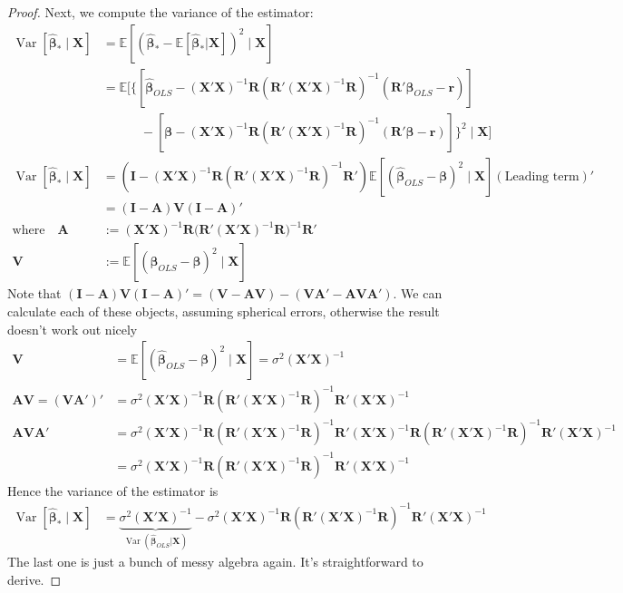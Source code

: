 \documentclass[12pt]{article}
\theoremstyle{plain}
\theoremstyle{definition}
\theoremstyle{remark}
\newcommand{\bsA}{\boldsymbol{A}}
\newcommand{\bsI}{\boldsymbol{I}}
\newcommand{\bsX}{\boldsymbol{X}}
\newcommand{\bsV}{\boldsymbol{V}}
\newcommand{\bsbeta}{\boldsymbol{\beta}}
\newcommand{\bshatbeta}{\boldsymbol{\hat{\beta}}}
\newcommand{\bsR}{\boldsymbol{R}}
\newcommand{\bsr}{\boldsymbol{r}}
\newcommand{\E}{\mathbb{E}}
\newcommand{\Var}{\operatorname{Var}}
\begin{document}
\begin{proof}
Next, we compute the variance of the estimator:
\begin{align*}
  \Var[\bshatbeta_*\;|\;\bsX]
  &=
  \E\left[
    \left(\bshatbeta_*- \E[\bshatbeta_*|\bsX]\right)^2
  \;|\;\bsX \right] \\
  &=
  \E\bigg[
  \bigg\{
  \left[
  \bshatbeta_{OLS} - (\bsX'\bsX)^{-1}  \bsR
  \left(\bsR'(\bsX'\bsX)^{-1}  \bsR\right)^{-1}
  \left(\bsR'\bshatbeta_{OLS} -  \bsr\right)
  \right]\\
  &\qquad\quad
  -
  \left[
  \bsbeta -
  (\bsX'\bsX)^{-1}  \bsR \left(\bsR'(\bsX'\bsX)^{-1}\bsR\right)^{-1} \left(\bsR' \bsbeta -\bsr\right)
  \right]
  \bigg\}^2
  \;\big|\;\bsX
  \bigg] \\
  \Var[\bshatbeta_*\;|\;\bsX]
  &=
  \left(
  \bsI - (\bsX'\bsX)^{-1}  \bsR \left(\bsR'(\bsX'\bsX)^{-1}  \bsR\right)^{-1} \bsR'
  \right)
  \E\left[ (\bshatbeta_{OLS}-\bsbeta)^2 \;\big|\;\bsX \right]
  \left(
  \text{Leading term}
  \right)' \\
  &= (\bsI - \bsA)\bsV(\bsI-\bsA)'
  \\
  \text{where}
  \quad
  \bsA &:=
    (\bsX'\bsX)^{-1}  \bsR \big(\bsR'(\bsX'\bsX)^{-1}  \bsR\big)^{-1} \bsR' \\
  \bsV
  &:= \E\left[ (\bshatbeta_{OLS}-\bsbeta)^2 \;\big|\;\bsX \right]
\end{align*}
Note that
$(\bsI-\bsA)\bsV(\bsI-\bsA)'=(\bsV-\bsA\bsV)-(\bsV\bsA'-\bsA\bsV\bsA')$.
We can calculate each of these objects, assuming spherical errors,
otherwise the result doesn't work out nicely
\begin{align*}
  \bsV
  &=
  \E\left[ (\bshatbeta_{OLS}-\bsbeta)^2 \;\big|\;\bsX \right]
  =
  \sigma^2(\bsX'\bsX)^{-1} \\
  \bsA\bsV = (\bsV\bsA')'
  &=
  \sigma^2(\bsX'\bsX)^{-1}  \bsR \left(\bsR'(\bsX'\bsX)^{-1}  \bsR\right)^{-1} \bsR'
  (\bsX'\bsX)^{-1} \\
  \bsA\bsV\bsA'
  &=
  \sigma^2(\bsX'\bsX)^{-1}  \bsR \left(\bsR'(\bsX'\bsX)^{-1}  \bsR\right)^{-1} \bsR'
  (\bsX'\bsX)^{-1}
  \bsR \left(\bsR'(\bsX'\bsX)^{-1}  \bsR\right)^{-1} \bsR'(\bsX'\bsX)^{-1}
  \\
  &=
  \sigma^2(\bsX'\bsX)^{-1}  \bsR
  \left(\bsR'(\bsX'\bsX)^{-1}  \bsR\right)^{-1} \bsR'(\bsX'\bsX)^{-1}
\end{align*}
Hence the variance of the estimator is
\begin{align*}
  \Var[\bshatbeta_*\;|\;\bsX]
  &=
  \underbrace{\sigma^2(\bsX'\bsX)^{-1}}_{\Var(\bshatbeta_{OLS}|\bsX)}
  -
  \sigma^2(\bsX'\bsX)^{-1}  \bsR
  \left(\bsR'(\bsX'\bsX)^{-1}  \bsR\right)^{-1} \bsR'(\bsX'\bsX)^{-1}
\end{align*}
The last one is just a bunch of messy algebra again. It's
straightforward to derive.
\end{proof}
\end{document}
